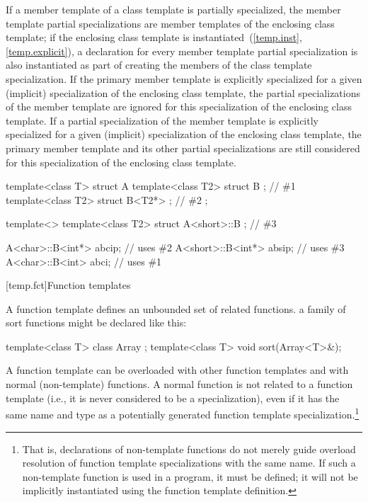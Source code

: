 \pnum
If a member template of a class template is partially specialized,
the member template partial specializations are member templates of
the enclosing class template;
if the enclosing class template is instantiated~(\ref{temp.inst}, \ref{temp.explicit}),
a declaration for every member template partial specialization is also
instantiated as part of creating the members of the class template
specialization.
If the primary member template is explicitly specialized for a given
(implicit) specialization of the enclosing class template,
the partial specializations of the member template are ignored for this
specialization of the enclosing class template.
If a partial specialization of the member template is explicitly specialized
for a given (implicit) specialization of the enclosing class template,
the primary member template and its other partial specializations are
still considered for this specialization of the enclosing class template.
\enterexample

\begin{codeblock}
template<class T> struct A {
	template<class T2> struct B {};         // \#1
	template<class T2> struct B<T2*> {};    // \#2
};

template<> template<class T2> struct A<short>::B {};	// \#3

A<char>::B<int*>  abcip;	// uses \#2
A<short>::B<int*> absip;	// uses \#3
A<char>::B<int>   abci;		// uses \#1
\end{codeblock}
\exitexampleb

[temp.fct]{Function templates}

\pnum
A function template defines an unbounded set of related functions.
\enterexample
a family of sort functions might be declared like this:

\begin{codeblock}
template<class T> class Array { };
template<class T> void sort(Array<T>&);
\end{codeblock}
\exitexampleb

\pnum
A function template can be overloaded with other function templates
and with normal (non-template) functions.
A normal function is not
related to a function template
(i.e., it is never considered to be a specialization),
even if it has the same name and type
as a potentially generated function template specialization.\footnote{That is,
declarations of non-template functions do not merely guide
overload resolution of
function template specializations
with the same name.
If such a non-template function is used in a program, it must be defined;
it will not be implicitly instantiated using the function template definition.}

